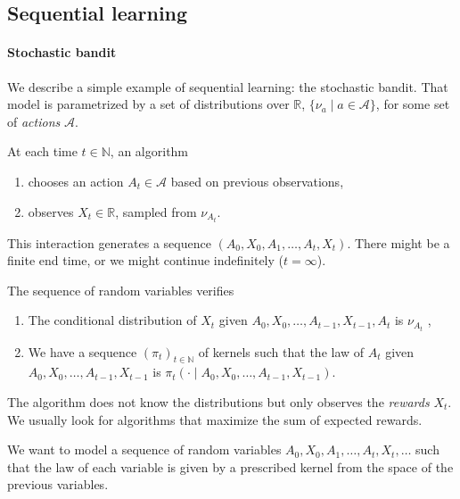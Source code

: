 
\subsection{Sequential learning}
\label{sub:sequential_learning}

\paragraph{Stochastic bandit}

We describe a simple example of sequential learning: the stochastic bandit. That model is parametrized by a set of distributions over $\mathbb{R}$, $\{\nu_a \mid a \in \mathcal A\}$, for some set of \emph{actions} $\mathcal A$.

At each time $t \in \mathbb{N}$, an algorithm
\begin{enumerate}
	\item chooses an action $A_t \in \mathcal A$ based on previous observations,
	\item observes $X_t \in \mathbb{R}$, sampled from $\nu_{A_t}$.
\end{enumerate}

This interaction generates a sequence $(A_0, X_0, A_1, \ldots, A_t, X_t)$. There might be a finite end time, or we might continue indefinitely ($t = \infty$).

The sequence of random variables verifies \cite{lattimore2020bandit}
\begin{enumerate}
    \item The conditional distribution of $X_t$ given $A_0, X_0, \ldots, A_{t-1}, X_{t-1}, A_t$ is $\nu_{A_t}$ ,
    \item We have a sequence $(\pi_t)_{t\in \mathbb{N}}$ of kernels such that the law of $A_t$ given $A_0, X_0, \ldots, A_{t-1}, X_{t-1}$ is $\pi_t(\cdot \mid A_0, X_0, \ldots, A_{t-1}, X_{t-1})$.
\end{enumerate}

The algorithm does not know the distributions but only observes the \emph{rewards} $X_t$. We usually look for algorithms that maximize the sum of expected rewards.

\begin{remark}
We want to model a sequence of random variables $A_0, X_0, A_1, \ldots, A_t, X_t, \ldots$ such that the law of each variable is given by a prescribed kernel from the space of the previous variables.
\end{remark}

